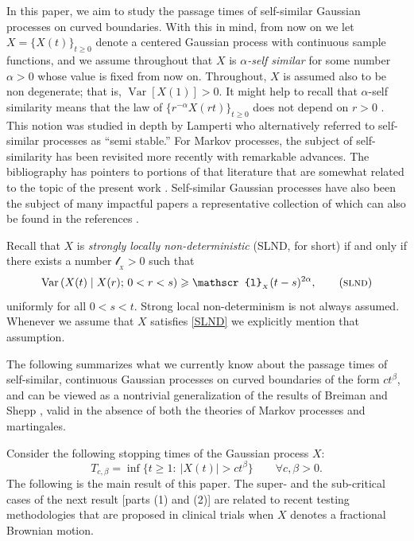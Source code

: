 \documentclass[reqno]{amsart}
\DeclareMathOperator{\Var}{Var}
\newcommand{\<}{\langle}
\renewcommand{\>}{\rangle}
\newcommand{\1}{\mathbb{1}}
\renewcommand{\ge}{\geqslant}
\theoremstyle{definition}
\numberwithin{equation}{section}
\begin{document}
In this paper, we aim to study the passage times of self-similar Gaussian processes on
curved boundaries. 
With this in mind, from now on we let $X=\{X(t)\}_{t\ge0}$ denote a centered Gaussian process
with continuous sample functions, and we assume throughout
that $X$ is  \emph{$\alpha$-self similar} for
some number $\alpha>0$ whose value is fixed from now on. Throughout,
$X$ is assumed also to be non degenerate; that is, 
$\Var[X(1)]>0$. It might help
to recall that $\alpha$-self similarity means that the law of $\{r^{-\alpha}X(rt)\}_{t\ge0}$ does not depend on
$r>0$ \cite{Kolmogorov,MandelbrotVanNess}.
This notion was studied in depth by
Lamperti \cite{Lamperti62,Lamperti67,Lamperti72} who alternatively referred to self-similar processes
as ``semi stable.'' For  Markov processes, the subject of self-similarity  has 
been revisited more recently with remarkable advances. The bibliography
has pointers to portions of that literature that are somewhat related to the topic of the present work
\cite{BarczyDoring,BertoinKorchemski,BertoinYor2002A,BertoinYor2002B,CaballeroChaumont,
	CP,CKP,CKPR,DDK,DT,Doring,DoringBarczy,GnedinPitman,GV,KimSongVondracek,KMR,
	LingWang,MicloPatieSarkar,Pardo,PardoRivero,Patie,Rivero2003,Rivero2005,Rivero2007,
	Vidmar,Xiao}.
Self-similar Gaussian processes have also been the subject of many impactful papers a 
representative collection of which can also be found in the references
\cite{CDG,Coeurjolly,Dobrushin,Funaki,GoodmanKuelbs,GHN,HHX,
	HN2017,HN2018,KalbasiMountford,KentWood,MM,MasonXiao,
	MS,Molchan,Muraoka,NX,SM,Song,ZPMPGR}.

Recall  that $X$ is
\emph{strongly locally non-deterministic} (SLND, for short) 
\cite{Berman1978,Berman1987,MonradPitt,CuzickDupreez,Xiao1996,Pitt78} if and only if there exists a number $\mathscr{l}_{_X}>0$ such that
\[
	\Var\left( X(t) \mid X(r);\, 0<r<s\right)
	\ge \mathscr{l}_{_X} (t-s)^{2\alpha},
	\tag{\textsc{slnd}}\label{SLND}
\]
uniformly for all $0<s<t$. Strong local non-determinism is not always
assumed. Whenever we assume that $X$ satisfies \eqref{SLND} 
we explicitly mention that assumption.

The following summarizes what we currently know about the passage times of 
self-similar, continuous Gaussian processes on curved boundaries of
the form $ct^\beta$, and can be viewed as a nontrivial generalization
of the results of Breiman \cite{Breiman} and Shepp \cite{Shepp}, valid
in the absence of both the theories of Markov processes and martingales.


Consider the following stopping times of the Gaussian process $X$:
\[
	T_{c,\beta} = \inf\{ t\ge1:\ |X(t)| > ct^\beta\}
	\qquad\forall c,\beta>0.
\]
The following is the main result of this paper. The super- and the sub-critical 
cases of the next result [parts (1) and (2)] are related
to recent testing methodologies that are proposed in
clinical trials \cite{Lai,LaiETAL,ZhangLai} when
$X$ denotes a fractional Brownian motion.
	
\end{document}
